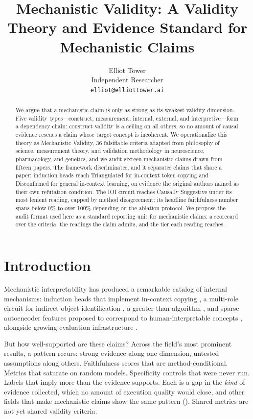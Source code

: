 \documentclass{article}
\title{Mechanistic Validity: A Validity Theory and Evidence Standard for Mechanistic Claims}
\author{%
  Elliot Tower \\
  Independent Researcher \\
  \texttt{elliot@elliottower.ai}
}
\begin{document}
\maketitle

\begin{abstract}
We argue that a mechanistic claim is only as strong as its weakest validity dimension. Five validity types---construct, measurement, internal, external, and interpretive---form a dependency chain: construct validity is a ceiling on all others, so no amount of causal evidence rescues a claim whose target concept is incoherent. We operationalize this theory as Mechanistic Validity, 36 falsifiable criteria adapted from philosophy of science, measurement theory, and validation methodology in neuroscience, pharmacology, and genetics, and we audit sixteen mechanistic claims drawn from fifteen papers. The framework discriminates, and it separates claims that share a paper: induction heads reach Triangulated for in-context token copying and Disconfirmed for general in-context learning, on evidence the original authors named as their own refutation condition. The IOI circuit reaches Causally Suggestive under its most lenient reading, capped by method disagreement: its headline faithfulness number spans below 0\% to over 100\% depending on the ablation protocol. We propose the audit format used here as a standard reporting unit for mechanistic claims: a scorecard over the criteria, the readings the claim admits, and the tier each reading reaches.
\end{abstract}

\section{Introduction}
\label{sec:intro}

Mechanistic interpretability has produced a remarkable catalog of internal mechanisms:
induction heads that implement in-context copying \citep{olsson2022context}, a multi-role
circuit for indirect object identification \citep{wang2023interpretability}, a greater-than
algorithm \citep{hanna2023greater}, and sparse autoencoder features proposed to correspond
to human-interpretable concepts \citep{cunningham2024sparse, bricken2023monosemanticity}, alongside growing evaluation infrastructure \citep{miller2024transformer, mueller2025mib, karvonen2025saebench, chan2022causal}.

But how well-supported are these claims? Across the field's most prominent results, a pattern recurs: strong evidence along one dimension, untested assumptions along others. Faithfulness scores that are method-conditional. Metrics that saturate on random models. Specificity controls that were never run. Labels that imply more than the evidence supports. Each is a gap in the \emph{kind} of evidence collected, which no amount of execution quality would close, and other fields that make mechanistic claims show the same pattern (). Shared metrics are not yet shared validity criteria.
\end{document}
